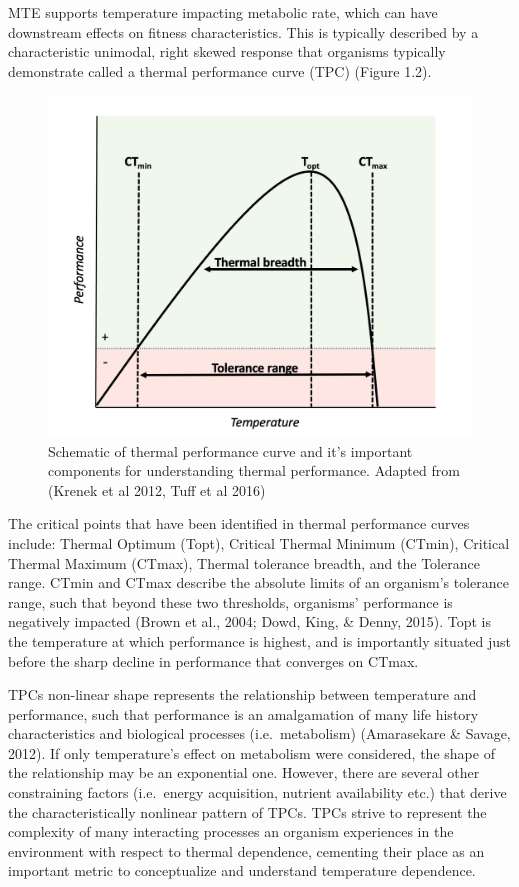 \documentclass[12pt,twoside]{reedthesis}
\begin{document}
MTE supports temperature impacting metabolic rate, which can have downstream effects on fitness characteristics. This is typically described by a characteristic unimodal, right skewed response that organisms typically demonstrate called a thermal performance curve (TPC) (Figure 1.2).
\begin{figure}

{\centering \includegraphics[width=0.9\linewidth]{figures/figure2} 

}

\caption[Thermal performance curve components]{Schematic of thermal performance curve and it’s important components for understanding thermal performance. Adapted from (Krenek et al 2012, Tuff et al 2016)}\label{fig:unnamed-chunk-4}
\end{figure}
The critical points that have been identified in thermal performance curves include: Thermal Optimum (Topt), Critical Thermal Minimum (CTmin), Critical Thermal Maximum (CTmax), Thermal tolerance breadth, and the Tolerance range. CTmin and CTmax describe the absolute limits of an organism's tolerance range, such that beyond these two thresholds, organisms' performance is negatively impacted (Brown et al., 2004; Dowd, King, \& Denny, 2015). Topt is the temperature at which performance is highest, and is importantly situated just before the sharp decline in performance that converges on CTmax.

TPCs non-linear shape represents the relationship between temperature and performance, such that performance is an amalgamation of many life history characteristics and biological processes (i.e.~metabolism) (Amarasekare \& Savage, 2012). If only temperature's effect on metabolism were considered, the shape of the relationship may be an exponential one. However, there are several other constraining factors (i.e.~energy acquisition, nutrient availability etc.) that derive the characteristically nonlinear pattern of TPCs. TPCs strive to represent the complexity of many interacting processes an organism experiences in the environment with respect to thermal dependence, cementing their place as an important metric to conceptualize and understand temperature dependence.
\end{document}
